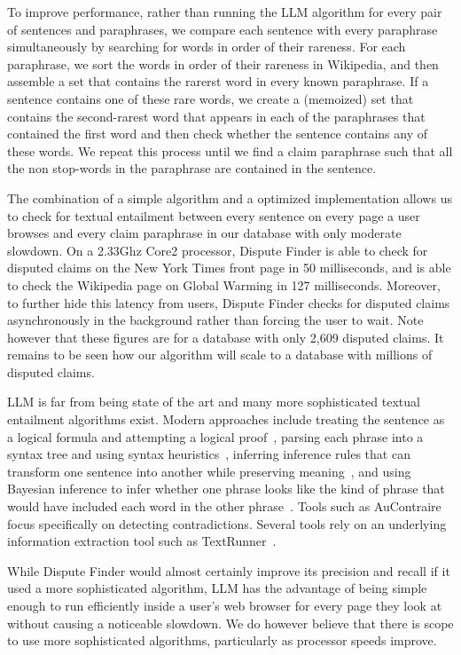 \documentclass{www2010-submission}
\begin{document}
To improve performance, rather than running the LLM algorithm for every pair of sentences and paraphrases, we compare each sentence with every paraphrase simultaneously by searching for words in order of their rareness. For each paraphrase, we sort the words in order of their rareness in Wikipedia, and then assemble a set that contains the rarerst word in every known paraphrase. If a sentence contains one of these rare words, we create a (memoized) set that contains the second-rarest word that appears in each of the paraphrases that contained the first word and then check whether the sentence contains any of these words. We repeat this process until we find a claim paraphrase such that all the non stop-words in the paraphrase are contained in the sentence.

The combination of a simple algorithm and a optimized implementation allows us to check for textual entailment between every sentence on every page a user browses and every claim paraphrase in our database with only moderate slowdown. On a 2.33Ghz Core2 processor, Dispute Finder is able to check for disputed claims on the New York Times front page in 50 milliseconds, and is able to check the Wikipedia page on Global Warming in 127 milliseconds. Moreover, to further hide this latency from users, Dispute Finder checks for disputed claims asynchronously in the background rather than forcing the user to wait. Note however that these figures are for a database with only 2,609 disputed claims. It remains to be seen how our algorithm will scale to a database with millions of disputed claims.

LLM is far from being state of the art and many more sophisticated textual entailment algorithms exist. Modern approaches include treating the sentence as a logical formula and attempting a logical proof~\cite{Bayer2001,Bos2005}, parsing each phrase into a syntax tree and using syntax heuristics~\cite{Snow2006}, inferring inference rules that can transform one sentence into another while preserving meaning~\cite{Lin2001,Dinu2009,Bhagat2009}, and using Bayesian inference to infer whether one phrase looks like the kind of phrase that would have included each word in the other phrase~\cite{Glickman2005}. Tools such as AuContraire~\cite{Ritter} focus specifically on detecting contradictions. Several tools rely on an underlying information extraction tool such as TextRunner~\cite{Etzioni2008}.

While Dispute Finder would almost certainly improve its precision and recall if it used a more sophisticated algorithm, LLM has the advantage of being simple enough to run efficiently inside a user's web browser for every page they look at without causing a noticeable slowdown. We do however believe that there is scope to use more sophisticated algorithms, particularly as processor speeds improve.
\end{document}
